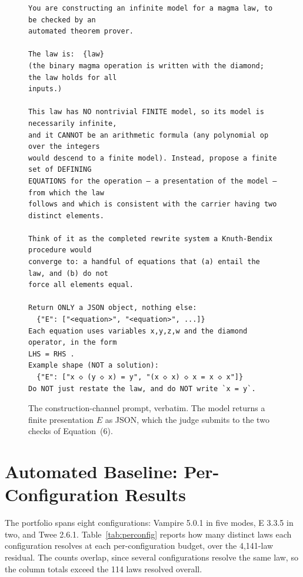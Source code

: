 \documentclass[letterpaper]{article}
\begin{document}
\begin{figure}[t]
\begin{lstlisting}
You are constructing an infinite model for a magma law, to be checked by an
automated theorem prover.

The law is:  {law}
(the binary magma operation is written with the diamond; the law holds for all
inputs.)

This law has NO nontrivial FINITE model, so its model is necessarily infinite,
and it CANNOT be an arithmetic formula (any polynomial op over the integers
would descend to a finite model). Instead, propose a finite set of DEFINING
EQUATIONS for the operation — a presentation of the model — from which the law
follows and which is consistent with the carrier having two distinct elements.

Think of it as the completed rewrite system a Knuth-Bendix procedure would
converge to: a handful of equations that (a) entail the law, and (b) do not
force all elements equal.

Return ONLY a JSON object, nothing else:
  {"E": ["<equation>", "<equation>", ...]}
Each equation uses variables x,y,z,w and the diamond operator, in the form
LHS = RHS .
Example shape (NOT a solution):
  {"E": ["x ◇ (y ◇ x) = y", "(x ◇ x) ◇ x = x ◇ x"]}
Do NOT just restate the law, and do NOT write `x = y`.
\end{lstlisting}
\caption{The construction-channel prompt, verbatim. The model returns a finite
presentation $E$ as JSON, which the judge submits to the two checks of
Equation~(6).}
\label{fig:prompt-construct}
\end{figure}

\section{Automated Baseline: Per-Configuration Results}
\label{app:perconfig}

The portfolio spans eight configurations: Vampire 5.0.1 in five modes, E 3.3.5
\citep{schulz2019faster} in two, and Twee 2.6.1. Table~\ref{tab:perconfig} reports how many distinct
laws each configuration resolves at each per-configuration budget, over the
4,141-law residual. The counts overlap, since several configurations resolve
the same law, so the column totals exceed the 114 laws resolved overall.
\end{document}
